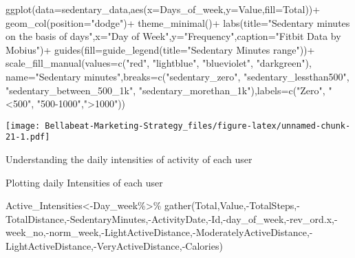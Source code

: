 \documentclass[
]{article}
\newenvironment{Shaded}{\begin{snugshade}}{\end{snugshade}}
\newcommand{\AttributeTok}[1]{\textcolor[rgb]{0.77,0.63,0.00}{#1}}
\newcommand{\FunctionTok}[1]{\textcolor[rgb]{0.00,0.00,0.00}{#1}}
\newcommand{\NormalTok}[1]{#1}
\newcommand{\OtherTok}[1]{\textcolor[rgb]{0.56,0.35,0.01}{#1}}
\newcommand{\SpecialCharTok}[1]{\textcolor[rgb]{0.00,0.00,0.00}{#1}}
\newcommand{\StringTok}[1]{\textcolor[rgb]{0.31,0.60,0.02}{#1}}
\begin{document}
\begin{Shaded}
\begin{Highlighting}[]
\FunctionTok{ggplot}\NormalTok{(}\AttributeTok{data=}\NormalTok{sedentary\_data,}\FunctionTok{aes}\NormalTok{(}\AttributeTok{x=}\NormalTok{Days\_of\_week,}\AttributeTok{y=}\NormalTok{Value,}\AttributeTok{fill=}\NormalTok{Total))}\SpecialCharTok{+}
  \FunctionTok{geom\_col}\NormalTok{(}\AttributeTok{position=}\StringTok{"dodge"}\NormalTok{)}\SpecialCharTok{+}
  \FunctionTok{theme\_minimal}\NormalTok{()}\SpecialCharTok{+}
  \FunctionTok{labs}\NormalTok{(}\AttributeTok{title=}\StringTok{"Sedentary minutes on the basis of days"}\NormalTok{,}\AttributeTok{x=}\StringTok{"Day of Week"}\NormalTok{,}\AttributeTok{y=}\StringTok{"Frequency"}\NormalTok{,}\AttributeTok{caption=}\StringTok{"Fitbit Data by Mobius"}\NormalTok{)}\SpecialCharTok{+}
  \FunctionTok{guides}\NormalTok{(}\AttributeTok{fill=}\FunctionTok{guide\_legend}\NormalTok{(}\AttributeTok{title=}\StringTok{"Sedentary Minutes range"}\NormalTok{))}\SpecialCharTok{+}
  \FunctionTok{scale\_fill\_manual}\NormalTok{(}\AttributeTok{values=}\FunctionTok{c}\NormalTok{(}\StringTok{"red"}\NormalTok{, }\StringTok{"lightblue"}\NormalTok{, }\StringTok{"blueviolet"}\NormalTok{, }\StringTok{"darkgreen"}\NormalTok{), }\AttributeTok{name=}\StringTok{"Sedentary minutes"}\NormalTok{,}\AttributeTok{breaks=}\FunctionTok{c}\NormalTok{(}\StringTok{"sedentary\_zero"}\NormalTok{, }\StringTok{"sedentary\_lessthan500"}\NormalTok{, }\StringTok{"sedentary\_between\_500\_1k"}\NormalTok{, }\StringTok{"sedentary\_morethan\_1k"}\NormalTok{),}\AttributeTok{labels=}\FunctionTok{c}\NormalTok{(}\StringTok{"Zero"}\NormalTok{, }\StringTok{"\textless{}500"}\NormalTok{, }\StringTok{"500{-}1000"}\NormalTok{,}\StringTok{"\textgreater{}1000"}\NormalTok{))}
\end{Highlighting}
\end{Shaded}

\texttt{[image: Bellabeat-Marketing-Strategy\_files/figure-latex/unnamed-chunk-21-1.pdf]}

Understanding the daily intensities of activity of each user

Plotting daily Intensities of each user

\begin{Shaded}
\begin{Highlighting}[]
\NormalTok{Active\_Intensities}\OtherTok{\textless{}{-}}\NormalTok{Day\_week}\SpecialCharTok{\%\textgreater{}\%}
  \FunctionTok{gather}\NormalTok{(Total,Value,}\SpecialCharTok{{-}}\NormalTok{TotalSteps,}\SpecialCharTok{{-}}\NormalTok{TotalDistance,}\SpecialCharTok{{-}}\NormalTok{SedentaryMinutes,}\SpecialCharTok{{-}}\NormalTok{ActivityDate,}\SpecialCharTok{{-}}\NormalTok{Id,}\SpecialCharTok{{-}}\NormalTok{day\_of\_week,}\SpecialCharTok{{-}}\NormalTok{rev\_ord.x,}\SpecialCharTok{{-}}\NormalTok{week\_no,}\SpecialCharTok{{-}}\NormalTok{norm\_week,}\SpecialCharTok{{-}}\NormalTok{LightActiveDistance,}\SpecialCharTok{{-}}\NormalTok{ModeratelyActiveDistance,}\SpecialCharTok{{-}}\NormalTok{LightActiveDistance,}\SpecialCharTok{{-}}\NormalTok{VeryActiveDistance,}\SpecialCharTok{{-}}\NormalTok{Calories)}
\end{Highlighting}
\end{Shaded}
\end{document}
